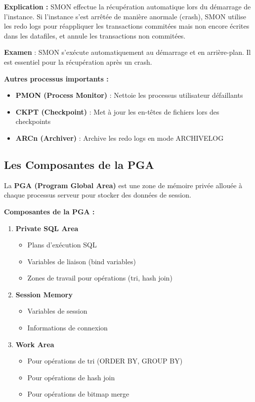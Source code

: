 \documentclass[11pt,a4paper]{article}
\begin{document}
\textbf{Explication :} SMON effectue la récupération automatique lors du démarrage de l'instance. Si l'instance s'est arrêtée de manière anormale (crash), SMON utilise les redo logs pour réappliquer les transactions commitées mais non encore écrites dans les datafiles, et annule les transactions non commitées.

\begin{tipbox}
\textbf{Examen} : SMON s'exécute automatiquement au démarrage et en arrière-plan. Il est essentiel pour la récupération après un crash.
\end{tipbox}

\textbf{Autres processus importants :}
\begin{itemize}
    \item \textbf{PMON (Process Monitor)} : Nettoie les processus utilisateur défaillants
    \item \textbf{CKPT (Checkpoint)} : Met à jour les en-têtes de fichiers lors des checkpoints
    \item \textbf{ARCn (Archiver)} : Archive les redo logs en mode ARCHIVELOG
\end{itemize}

\subsection{Les Composantes de la PGA}

\begin{definitionbox}
La \textbf{PGA (Program Global Area)} est une zone de mémoire privée allouée à chaque processus serveur pour stocker des données de session.
\end{definitionbox}

\textbf{Composantes de la PGA :}

\begin{enumerate}
    \item \textbf{Private SQL Area}
    \begin{itemize}
        \item Plans d'exécution SQL
        \item Variables de liaison (bind variables)
        \item Zones de travail pour opérations (tri, hash join)
    \end{itemize}
    
    \item \textbf{Session Memory}
    \begin{itemize}
        \item Variables de session
        \item Informations de connexion
    \end{itemize}
    
    \item \textbf{Work Area}
    \begin{itemize}
        \item Pour opérations de tri (ORDER BY, GROUP BY)
        \item Pour opérations de hash join
        \item Pour opérations de bitmap merge
    \end{itemize}
\end{enumerate}
\end{document}
